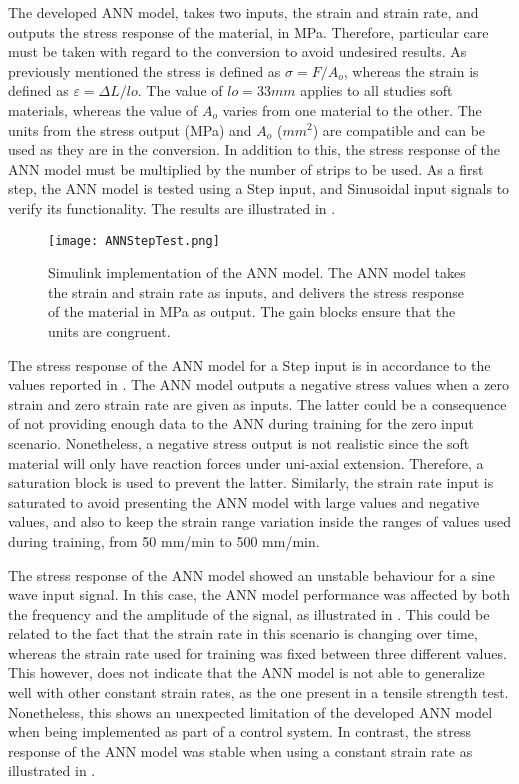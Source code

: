 The developed ANN model, takes two inputs, the strain and strain rate, and outputs the stress response of the material, in MPa. Therefore, particular care must be taken with regard to the conversion to avoid undesired results. As previously mentioned the stress is defined as $\sigma = F/A_o$, whereas the strain is defined as $\varepsilon = \Delta L / lo$. The value of $lo=33mm$ applies to all studies soft materials, whereas the value of $A_o$ varies from one material to the other. The units from the stress output (MPa) and $A_o$ ($mm^2$) are compatible and can be used as they are in the conversion. In addition to this, the stress response of the ANN model must be multiplied by the number of strips to be used. As a first step, the ANN model is tested using a Step input, and Sinusoidal input signals to verify its functionality. The results are illustrated in .

\begin{figure}[hbtp!]
    \centering
    \texttt{[image: ANNStepTest.png]}
    \caption{ Simulink implementation of the ANN model. The ANN model takes the strain and strain rate as inputs, and delivers the stress response of the material in MPa as output. The gain blocks ensure that the units are congruent. }
    \label{fig:ANNStepTest}
\end{figure}

The stress response of the ANN model for a Step input is in accordance to the values reported in . The ANN model outputs a negative stress values when a zero strain and zero strain rate are given as inputs. The latter could be a consequence of not providing enough data to the ANN during training for the zero input scenario. Nonetheless, a negative stress output is not realistic since the soft material will only have reaction forces under uni-axial extension. Therefore, a saturation block is used to prevent the latter. Similarly, the strain rate input is saturated to avoid presenting the ANN model with large values and negative values, and also to keep the strain range variation inside the ranges of values used during training, from 50 mm/min to 500 mm/min.

The stress response of the ANN model showed an unstable behaviour for a sine wave input signal. In this case, the ANN model performance was affected by both the frequency and the amplitude of the signal, as illustrated in . This could be related to the fact that the strain rate in this scenario is changing over time, whereas the strain rate used for training was fixed between three different values. This however, does not indicate that the ANN model is not able to generalize well with other constant strain rates, as the one present in a tensile strength test. Nonetheless, this shows an unexpected limitation of the developed ANN model when being implemented as part of a control system. In contrast, the stress response of the ANN model was stable when using a constant strain rate as illustrated in .

